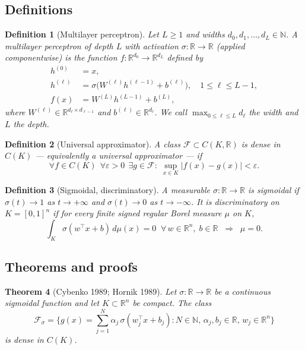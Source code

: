 \documentclass[11pt]{article}
\newtheorem{theorem}{Theorem}[section]
\newtheorem{definition}[theorem]{Definition}
\theoremstyle{remark}
\begin{document}
\subsection*{Definitions}

\begin{definition}[Multilayer perceptron]
Let $L \geq 1$ and widths $d_0, d_1, \dots, d_L \in \mathbb{N}$. A \emph{multilayer perceptron of depth $L$} with activation $\sigma : \mathbb{R} \to \mathbb{R}$ (applied componentwise) is the function $f : \mathbb{R}^{d_0} \to \mathbb{R}^{d_L}$ defined by
\begin{align*}
h^{(0)} &= x, \\
h^{(\ell)} &= \sigma\!\big(W^{(\ell)} h^{(\ell-1)} + b^{(\ell)}\big), \quad 1 \leq \ell \leq L-1, \\
f(x) &= W^{(L)} h^{(L-1)} + b^{(L)},
\end{align*}
where $W^{(\ell)} \in \mathbb{R}^{d_\ell \times d_{\ell-1}}$ and $b^{(\ell)} \in \mathbb{R}^{d_\ell}$. We call $\max_{0 \leq \ell \leq L} d_\ell$ the \emph{width} and $L$ the \emph{depth}.
\end{definition}

\begin{definition}[Universal approximator]
A class $\mathcal{F} \subset C(K, \mathbb{R})$ is \emph{dense} in $C(K)$ --- equivalently a \emph{universal approximator} --- if
\[
\forall f \in C(K)\;\, \forall \varepsilon > 0\;\, \exists g \in \mathcal{F} : \;\sup_{x \in K} \lvert f(x) - g(x) \rvert < \varepsilon.
\]
\end{definition}

\begin{definition}[Sigmoidal, discriminatory]
A measurable $\sigma : \mathbb{R} \to \mathbb{R}$ is \emph{sigmoidal} if $\sigma(t) \to 1$ as $t \to +\infty$ and $\sigma(t) \to 0$ as $t \to -\infty$. It is \emph{discriminatory} on $K = [0,1]^n$ if for every finite signed regular Borel measure $\mu$ on $K$,
\[
\int_K \sigma(w^\top x + b)\, d\mu(x) = 0 \;\;\forall\, w \in \mathbb{R}^n,\; b \in \mathbb{R} \;\;\Longrightarrow\;\; \mu = 0.
\]
\end{definition}

\subsection*{Theorems and proofs}

\begin{theorem}[Cybenko 1989; Hornik 1989]\label{thm:uat}
Let $\sigma : \mathbb{R} \to \mathbb{R}$ be a continuous sigmoidal function and let $K \subset \mathbb{R}^n$ be compact. The class
\[
\mathcal{F}_\sigma = \Big\{ g(x) = \sum_{j=1}^{N} \alpha_j\, \sigma(w_j^\top x + b_j) : N \in \mathbb{N},\, \alpha_j, b_j \in \mathbb{R},\, w_j \in \mathbb{R}^n \Big\}
\]
is dense in $C(K)$.
\end{theorem}
\end{document}
